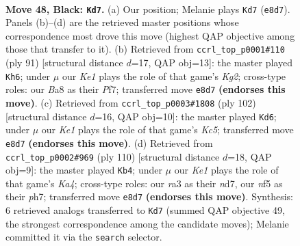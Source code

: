 \documentclass[11pt]{article}
\begin{document}
\clearpage

\begin{figure}[p]\centering
\begin{subfigure}{0.46\textwidth}\centering
\resizebox{\linewidth}{!}{%
\newchessgame
\chessboard[
  setfen={b3k2K/P4p1P/8/4PN2/8/R4p2/1r6/8 b - - 0 48},
  showmover=false,
  pgfstyle=straightmove, color=movearrow, markmove={e8-d7}
]}
\caption{}
\end{subfigure}\hfill
\begin{subfigure}{0.46\textwidth}\centering
\resizebox{\linewidth}{!}{%
\newchessgame
\chessboard[
  setfen={8/5pk1/4p3/1r6/5P2/4R2P/5P1K/8 b - - 2 46},
  showmover=false,
  pgfstyle=straightmove, color=movearrow, markmove={g7-h6}
]}
\caption{}
\end{subfigure}
\\[4pt]
\begin{subfigure}{0.46\textwidth}\centering
\resizebox{\linewidth}{!}{%
\newchessgame
\chessboard[
  setfen={8/R7/5ppk/2KB3p/8/7P/4r1P1/8 w - - 29 52},
  showmover=false,
  pgfstyle=straightmove, color=movearrow, markmove={c5-d6}
]}
\caption{}
\end{subfigure}\hfill
\begin{subfigure}{0.46\textwidth}\centering
\resizebox{\linewidth}{!}{%
\newchessgame
\chessboard[
  setfen={3B4/3n1k1p/1P4p1/8/K3p3/8/6PP/8 w - - 0 56},
  showmover=false,
  pgfstyle=straightmove, color=movearrow, markmove={a4-b4}
]}
\caption{}
\end{subfigure}
\caption{\textbf{Move 48, Black: \texttt{Kd7}.} (a) Our position; Melanie plays \texttt{Kd7} (\texttt{e8d7}). Panels (b)--(d) are the retrieved master positions whose correspondence most drove this move (highest QAP objective among those that transfer to it). (b) Retrieved from \texttt{ccrl\_top\_p0001\#110} (ply 91) [structural distance $d$=17, QAP obj=13]: the master played \texttt{Kh6}; under $\mu$ our \emph{Ke1} plays the role of that game's \emph{Kg2}; cross-type roles: our \emph{B}a8 as their \emph{P}f7; transferred move \texttt{e8d7} \textbf{(endorses this move)}. (c) Retrieved from \texttt{ccrl\_top\_p0003\#1808} (ply 102) [structural distance $d$=16, QAP obj=10]: the master played \texttt{Kd6}; under $\mu$ our \emph{Ke1} plays the role of that game's \emph{Kc5}; transferred move \texttt{e8d7} \textbf{(endorses this move)}. (d) Retrieved from \texttt{ccrl\_top\_p0002\#969} (ply 110) [structural distance $d$=18, QAP obj=9]: the master played \texttt{Kb4}; under $\mu$ our \emph{Ke1} plays the role of that game's \emph{Ka4}; cross-type roles: our \emph{r}a3 as their \emph{n}d7, our \emph{n}f5 as their \emph{p}h7; transferred move \texttt{e8d7} \textbf{(endorses this move)}. Synthesis: 6 retrieved analogs transferred to \texttt{Kd7} (summed QAP objective 49, the strongest correspondence among the candidate moves); Melanie committed it via the \texttt{search} selector.}
\label{fig:thought-m95}
\end{figure}
\end{document}
